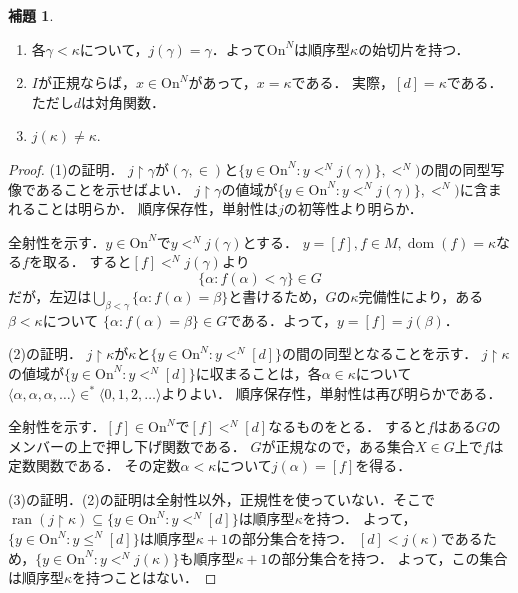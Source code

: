 \documentclass[uplatex]{jsarticle}
\newcommand{\range}{\operatorname{ran}}
\newcommand{\dom}{\operatorname{dom}}
\newcommand{\Ordinals}{\mathrm{On}}
\newcommand{\restrict}{\upharpoonright}
\newcommand{\seq}[1]{{\langle#1\rangle}}
\renewcommand\subset{\subseteq}
\theoremstyle{definition}
\newtheorem{lem}[thm]{補題}
\begin{document}
	\begin{lem}
		\begin{enumerate}
			\item 各$\gamma < \kappa$について，$j(\gamma) = \gamma$．よって$\Ordinals^N$は順序型$\kappa$の始切片を持つ．
			\item $I$が正規ならば，$x \in \Ordinals^N$があって，$x = \kappa$である．
			実際，$[d] = \kappa$である．ただし$d$は対角関数．
			\item $j(\kappa) \ne \kappa$.
		\end{enumerate}
	\end{lem}
	\begin{proof}
		(1)の証明．
		$j \upharpoonright \gamma$が$(\gamma, \in)$と$\{ y \in \Ordinals^N : y <^N j(\gamma)\}, <^N)$の間の同型写像であることを示せばよい．
		$j \upharpoonright \gamma$の値域が$\{ y \in \Ordinals^N : y <^N j(\gamma)\}, <^N)$に含まれることは明らか．
		順序保存性，単射性は$j$の初等性より明らか．
		
		全射性を示す．$y \in \Ordinals^N$で$y <^N j(\gamma)$とする．
		$y = [f], f \in M, \dom(f) = \kappa$なる$f$を取る．
		すると$[f] <^N j(\gamma)$より
		\[
		\{ \alpha : f(\alpha) < \gamma \} \in G
		\]
		だが，左辺は$\bigcup_{\beta < \gamma} \{\alpha : f(\alpha) = \beta \}$と書けるため，$G$の$\kappa$完備性により，ある$\beta < \kappa$について $\{\alpha : f(\alpha) = \beta\} \in G$である．よって，$y = [f] = j(\beta)$．
		
		(2)の証明．
		$j \upharpoonright \kappa$が$\kappa$と$\{ y \in \Ordinals^N : y <^N [d] \}$の間の同型となることを示す．
		$j \upharpoonright \kappa$の値域が$\{ y \in \Ordinals^N : y <^N [d] \}$に収まることは，各$\alpha \in \kappa$について$\seq{\alpha, \alpha, \alpha, \dots} \in^* \seq{0, 1, 2, \dots}$よりよい．
		順序保存性，単射性は再び明らかである．
		
		全射性を示す．$[f] \in \Ordinals^N$で$[f] <^N [d]$なるものをとる．
		すると$f$はある$G$のメンバーの上で押し下げ関数である．
		$G$が正規なので，ある集合$X \in G$上で$f$は定数関数である．
		その定数$\alpha < \kappa$について$j(\alpha) = [f]$を得る．
		
		(3)の証明．(2)の証明は全射性以外，正規性を使っていない．そこで$\range(j \restrict \kappa) \subset \{ y \in \Ordinals^N : y <^N [d] \}$は順序型$\kappa$を持つ．
		よって，$\{ y \in \Ordinals^N : y \le^N [d] \}$は順序型$\kappa + 1$の部分集合を持つ．
		$[d] < j(\kappa)$であるため，$\{ y \in \Ordinals^N : y <^N j(\kappa) \}$も順序型$\kappa + 1$の部分集合を持つ．
		よって，この集合は順序型$\kappa$を持つことはない．
	\end{proof}
	
\end{document}
